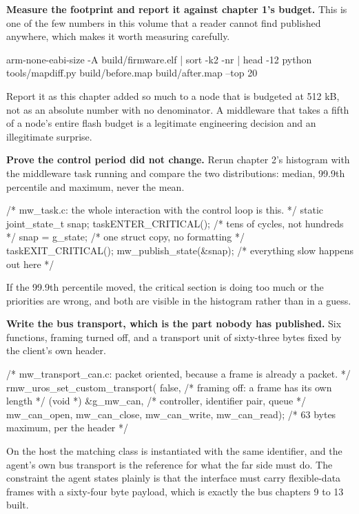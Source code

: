 \begin{steps}
\item \textbf{Measure the footprint and report it against chapter 1's budget.}
This is one of the few numbers in this volume that a reader cannot find
published anywhere, which makes it worth measuring carefully.
\begin{shellcode}
arm-none-eabi-size -A build/firmware.elf | sort -k2 -nr | head -12
python tools/mapdiff.py build/before.map build/after.map --top 20
\end{shellcode}
Report it as this chapter added so much to a node that is budgeted at 512 kB,
not as an absolute number with no denominator. A middleware that takes a fifth
of a node's entire flash budget is a legitimate engineering decision and an
illegitimate surprise.

\item \textbf{Prove the control period did not change.} Rerun chapter 2's
histogram with the middleware task running and compare the two distributions:
median, 99.9th percentile and maximum, never the mean.
\begin{ccode}
/* mw_task.c: the whole interaction with the control loop is this. */
static joint_state_t snap;
taskENTER_CRITICAL();                 /* tens of cycles, not hundreds */
snap = g_state;                       /* one struct copy, no formatting */
taskEXIT_CRITICAL();
mw_publish_state(&snap);              /* everything slow happens out here */
\end{ccode}
If the 99.9th percentile moved, the critical section is doing too much or the
priorities are wrong, and both are visible in the histogram rather than in a
guess.

\item \textbf{Write the bus transport, which is the part nobody has published.}
Six functions, framing turned off, and a transport unit of sixty-three bytes
fixed by the client's own header.
\begin{ccode}
/* mw_transport_can.c: packet oriented, because a frame is already a packet. */
rmw_uros_set_custom_transport(
    false,                            /* framing off: a frame has its own length */
    (void *) &g_mw_can,               /* controller, identifier pair, queue */
    mw_can_open, mw_can_close,
    mw_can_write, mw_can_read);       /* 63 bytes maximum, per the header */
\end{ccode}
On the host the matching class is instantiated with the same identifier, and the
agent's own bus transport is the reference for what the far side must do. The
constraint the agent states plainly is that the interface must carry flexible-data
frames with a sixty-four byte payload, which is exactly the bus chapters 9 to 13
built.


\end{steps}
